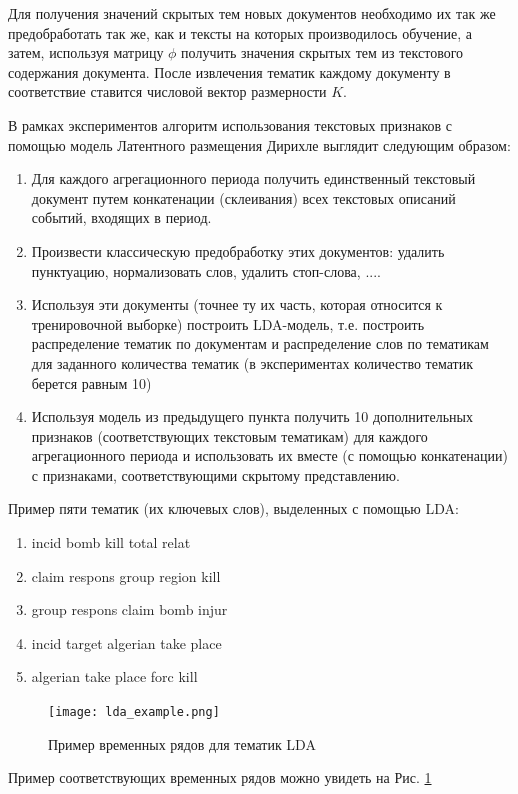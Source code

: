 Для получения значений скрытых тем новых документов необходимо их так же предобработать так же, как и тексты на которых производилось обучение, а затем, используя матрицу $\phi$ получить значения скрытых тем из текстового содержания документа.
После извлечения тематик каждому документу в соответствие ставится числовой вектор размерности $K$.

В рамках экспериментов алгоритм использования текстовых признаков с помощью модель Латентного размещения Дирихле выглядит следующим образом:
\begin{enumerate}
    \item Для каждого агрегационного периода получить единственный текстовый документ путем конкатенации (склеивания) всех текстовых описаний событий, входящих в период.
    \item Произвести классическую предобработку этих документов: удалить пунктуацию, нормализовать слов, удалить стоп-слова, ....
    \item Используя эти документы (точнее ту их часть, которая относится к тренировочной выборке) построить LDA-модель, т.е. построить распределение тематик по документам и распределение слов по тематикам для заданного количества тематик (в экспериментах количество тематик берется равным 10)
    \item Используя модель из предыдущего пункта получить 10 дополнительных признаков (соответствующих текстовым тематикам) для каждого агрегационного периода и использовать их вместе (с помощью конкатенации) с признаками, соответствующими скрытому представлению.
\end{enumerate}

Пример пяти тематик (их ключевых слов), выделенных с помощью LDA:
\begin{enumerate}
    \item incid bomb kill total relat
    \item claim respons group region kill
    \item group respons claim bomb injur
    \item incid target algerian take place
    \item algerian take place forc kill
\end{enumerate}

\begin{figure}
  \texttt{[image: lda\_example.png]}
  \caption{Пример временных рядов для тематик LDA}
  \label{fig:lda_example}
\end{figure}

Пример соответствующих временных рядов можно увидеть на Рис. \ref{fig:lda_example}

